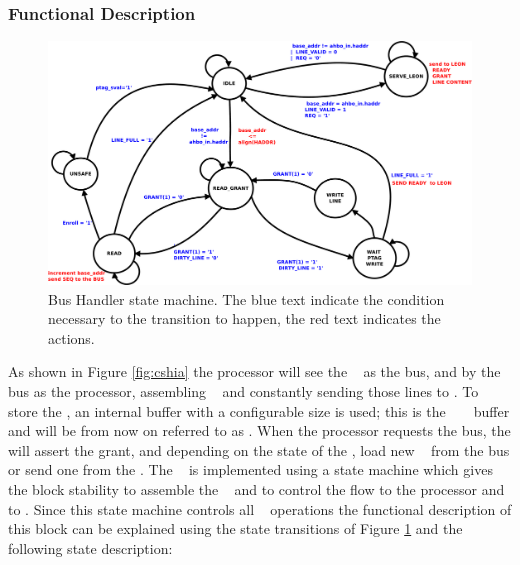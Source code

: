 \subsubsection{Functional Description}

\begin{figure}[!ht]
	\centering
	\includegraphics[scale=0.25]{figures/pdf/sec_hand_state_machine.pdf}
    \caption{Bus Handler state machine. The blue text indicate the condition necessary to the transition to happen, the red text indicates the \handler~ actions.   }
	\label{fig:phsm}
\end{figure}

As shown in Figure \ref{fig:cshia} the processor will see the \handler~ as the bus, and by the bus as the processor, assembling \slines~  and constantly sending those lines to \seceng.  To store the \slines, an internal buffer with a configurable size is used; this is the \handler~ \sline~ buffer and will be from now on referred to as \sbuf.  When the processor requests the bus, the \handler  will assert the grant, and depending on the state of the \sbuf, load new \slines~ from the bus or send one from the \sbuf. The \handler~ is implemented using a state machine which gives the block stability to assemble the \sline~ and to control the flow to the processor and to \seceng. Since this state machine controls all \handler~ operations the functional  description of this block can be explained using the state transitions  of Figure \ref{fig:phsm} and the following state description:


